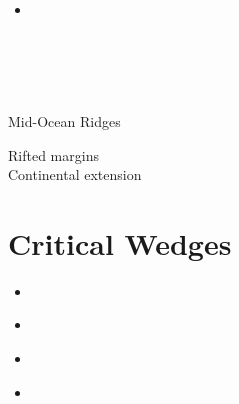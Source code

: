 \begin{scriptsize}
\begin{itemize}
\textcite{hebg21} \\
\textcite{nebg21} \\
\textcite{qill21} \\
\textcite{luhu21} \\
\textcite{gona21} \\
\textcite{manp21} \\
\textcite{jokd21} \\
\textcite{grrm21} \\
\textcite{deol21} \\
\item[\twothousandtwentytwo] 
\textcite{thhu22} \\
\textcite{olgr22} \\
\textcite{ludn22} \\
\textcite{rutb22} \\
\textcite{thhl22} \\
\end{itemize}
\end{scriptsize}


Mid-Ocean Ridges

\textcite{pukm22} 


Rifted margins
\textcite{pihg22} \\


Continental extension
\textcite{panb22} 


\section{Critical Wedges}

\begin{scriptsize}
\begin{itemize}
\item[\nineteenninetyfour] 
\textcite{koon94}\\
\item[\twothousandsix] 
\textcite{rosw06}\\
\item[\twothousandeight] 
\textcite{rowf08}\\
\item[\twothousandthirteen] 
\textcite{cass13}\\
\end{itemize}
\end{scriptsize}

